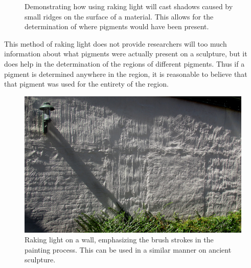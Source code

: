 \documentclass[10pt]{armath}
\begin{document}
\begin{figure}[htpb]
  \begin{center}
  \end{center}
  \caption{Demonstrating how using raking light will cast shadows caused by small
    ridges on the surface of a material. This allows for the determination of where
  pigments would have been present.}
  \label{fig:raking_light_2}
\end{figure}

This method of raking light does not provide researchers will too much
information about what pigments were actually present on a sculpture, but it
does help in the determination of the regions of different pigments. Thus if a
pigment is determined anywhere in the region, it is reasonable to  believe
that that pigment was used for the entirety of the region.

\begin{figure}[htpb]
  \centering
  \includegraphics[width=0.5\linewidth]{raking_light.jpg}
  \caption{Raking light on a wall, emphasizing the brush strokes in the
  painting process. This can be used in a similar manner on ancient sculpture.}
  \label{fig:raking_light}
\end{figure}
\end{document}
